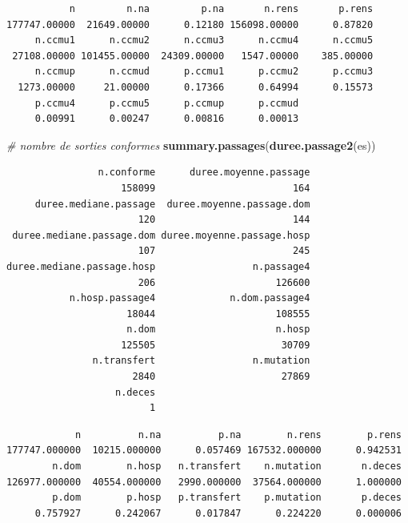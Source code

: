 \documentclass[]{article}
\newenvironment{Shaded}{\begin{snugshade}}{\end{snugshade}}
\newcommand{\KeywordTok}[1]{\textcolor[rgb]{0.13,0.29,0.53}{\textbf{{#1}}}}
\newcommand{\CommentTok}[1]{\textcolor[rgb]{0.56,0.35,0.01}{\textit{{#1}}}}
\newcommand{\NormalTok}[1]{{#1}}
\begin{document}
\begin{verbatim}
           n         n.na         p.na       n.rens       p.rens 
177747.00000  21649.00000      0.12180 156098.00000      0.87820 
     n.ccmu1      n.ccmu2      n.ccmu3      n.ccmu4      n.ccmu5 
 27108.00000 101455.00000  24309.00000   1547.00000    385.00000 
     n.ccmup      n.ccmud      p.ccmu1      p.ccmu2      p.ccmu3 
  1273.00000     21.00000      0.17366      0.64994      0.15573 
     p.ccmu4      p.ccmu5      p.ccmup      p.ccmud 
     0.00991      0.00247      0.00816      0.00013 
\end{verbatim}

\begin{Shaded}
\begin{Highlighting}[]
    \CommentTok{# nombre de sorties conformes}
    \KeywordTok{summary.passages}\NormalTok{(}\KeywordTok{duree.passage2}\NormalTok{(es))}
\end{Highlighting}
\end{Shaded}

\begin{verbatim}
                n.conforme      duree.moyenne.passage 
                    158099                        164 
     duree.mediane.passage  duree.moyenne.passage.dom 
                       120                        144 
 duree.mediane.passage.dom duree.moyenne.passage.hosp 
                       107                        245 
duree.mediane.passage.hosp                 n.passage4 
                       206                     126600 
           n.hosp.passage4             n.dom.passage4 
                     18044                     108555 
                     n.dom                     n.hosp 
                    125505                      30709 
               n.transfert                 n.mutation 
                      2840                      27869 
                   n.deces 
                         1 
\end{verbatim}

\begin{Shaded}
\end{Shaded}

\begin{verbatim}
            n          n.na          p.na        n.rens        p.rens 
177747.000000  10215.000000      0.057469 167532.000000      0.942531 
        n.dom        n.hosp   n.transfert    n.mutation       n.deces 
126977.000000  40554.000000   2990.000000  37564.000000      1.000000 
        p.dom        p.hosp   p.transfert    p.mutation       p.deces 
     0.757927      0.242067      0.017847      0.224220      0.000006 
\end{verbatim}
\end{document}
